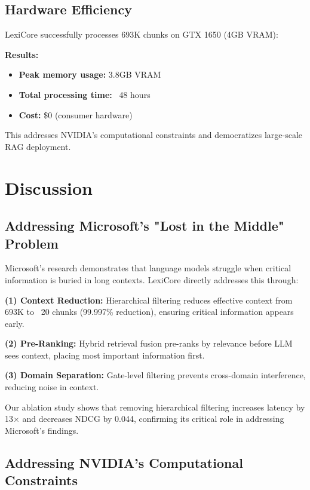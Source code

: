 \documentclass[11pt]{article}
\begin{document}
\subsection{Hardware Efficiency}

LexiCore successfully processes 693K chunks on GTX 1650 (4GB VRAM):

\textbf{Results:}
\begin{itemize}
    \item \textbf{Peak memory usage:} 3.8GB VRAM
    \item \textbf{Total processing time:} ~48 hours
    \item \textbf{Cost:} \$0 (consumer hardware)
\end{itemize}

This addresses NVIDIA's computational constraints and democratizes large-scale RAG deployment.

\section{Discussion}

\subsection{Addressing Microsoft's "Lost in the Middle" Problem}

Microsoft's research \cite{liu2023lost} demonstrates that language models struggle when critical information is buried in long contexts. LexiCore directly addresses this through:

\textbf{(1) Context Reduction:} Hierarchical filtering reduces effective context from 693K to ~20 chunks (99.997\% reduction), ensuring critical information appears early.

\textbf{(2) Pre-Ranking:} Hybrid retrieval fusion pre-ranks by relevance before LLM sees context, placing most important information first.

\textbf{(3) Domain Separation:} Gate-level filtering prevents cross-domain interference, reducing noise in context.

Our ablation study shows that removing hierarchical filtering increases latency by 13× and decreases NDCG by 0.044, confirming its critical role in addressing Microsoft's findings.

\subsection{Addressing NVIDIA's Computational Constraints}
\end{document}
